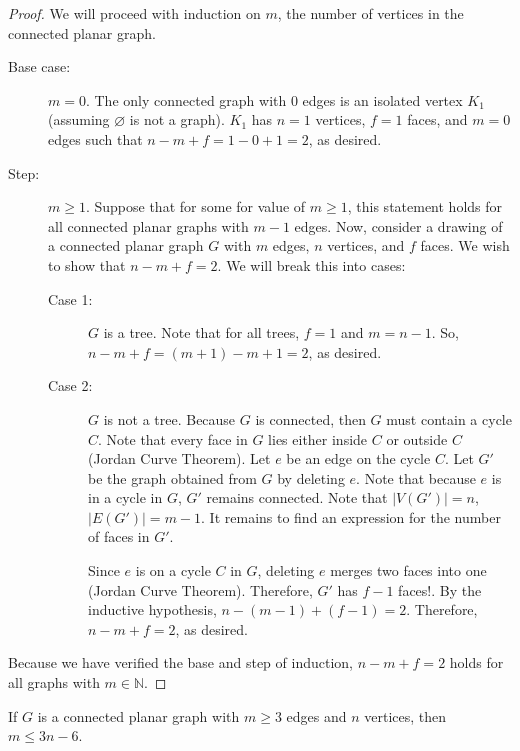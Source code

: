 \documentclass[a4paper]{article}
\begin{document}
\begin{proof}
	We will proceed with induction on \( m \), the number of vertices in the connected planar graph.
	\begin{description}
		\item[Base case:] \( m=0 \). The only connected graph with 0 edges is an isolated vertex \( K_1 \) (assuming \( \varnothing \) is not a graph). \( K_1 \) has \( n = 1 \) vertices, \( f=1 \) faces, and \( m=0 \) edges such that \( n-m+f = 1-0+1 = 2 \), as desired.
		\item[Step:] \( m\ge 1\). Suppose that for some for value of \( m\ge 1 \), this statement holds for all connected planar graphs with \( m-1 \) edges. Now, consider a drawing of a connected planar graph \( G \) with \( m \) edges, \( n \) vertices, and \( f \) faces. We wish to show that \( n-m+f=2 \). We will break this into cases: \par
			\begin{description}
				\item[Case 1:] \( G \) is a tree. Note that for all trees, \( f = 1 \) and \( m = n - 1 \). So, \( n-m+f=(m+1)-m+1=2 \), as desired.
				\item[Case 2:] \( G \) is not a tree. Because \( G \) is connected, then \( G \) must contain a cycle \( C \). Note that every face in \( G \) lies either inside \( C \) or outside \( C \) (Jordan Curve Theorem). Let \( e \) be an edge on the cycle \( C \). Let \( G' \) be the graph obtained from \( G \) by deleting \( e \). Note that because \( e \) is in a cycle in \( G \), \( G' \) remains connected. Note that \( |V(G')| = n \), \( |E(G')|=m-1 \). It remains to find an expression for the number of faces in \( G' \). \par
					Since \( e \) is on a cycle \( C \) in \( G \), deleting \( e \) merges two faces into one (Jordan Curve Theorem). Therefore, \( G' \) has \( f-1 \) faces!. By the inductive hypothesis, \( n-(m-1)+(f-1)=2 \). Therefore, \( n-m+f=2 \), as desired.
			\end{description}
	\end{description}
	Because we have verified the base and step of induction, \( n-m+f=2 \) holds for all graphs with \( m \in \mathbb{N} \).
\end{proof}

\begin{corollary}
	If \( G \) is a connected planar graph with \( m\ge 3 \) edges and \( n \) vertices, then \( m \le 3n-6 \).
\end{corollary}
\end{document}
